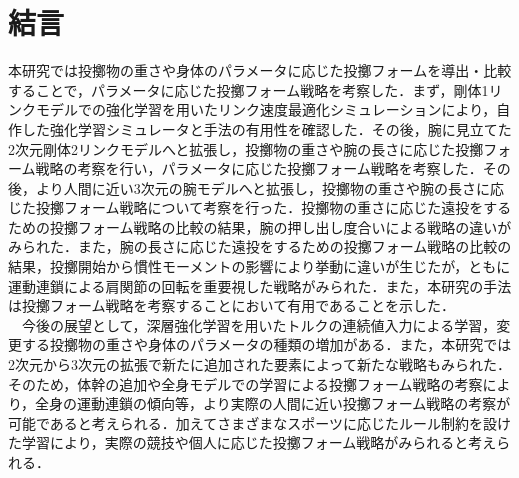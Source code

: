 \section{結言}
本研究では投擲物の重さや身体のパラメータに応じた投擲フォームを導出・比較することで，パラメータに応じた投擲フォーム戦略を考察した．まず，剛体1リンクモデルでの強化学習を用いたリンク速度最適化シミュレーションにより，自作した強化学習シミュレータと手法の有用性を確認した．その後，腕に見立てた2次元剛体2リンクモデルへと拡張し，投擲物の重さや腕の長さに応じた投擲フォーム戦略の考察を行い，パラメータに応じた投擲フォーム戦略を考察した．その後，より人間に近い3次元の腕モデルへと拡張し，投擲物の重さや腕の長さに応じた投擲フォーム戦略について考察を行った．投擲物の重さに応じた遠投をするための投擲フォーム戦略の比較の結果，腕の押し出し度合いによる戦略の違いがみられた．また，腕の長さに応じた遠投をするための投擲フォーム戦略の比較の結果，投擲開始から慣性モーメントの影響により挙動に違いが生じたが，ともに運動連鎖による肩関節の回転を重要視した戦略がみられた．また，本研究の手法は投擲フォーム戦略を考察することにおいて有用であることを示した．\\
　今後の展望として，深層強化学習を用いたトルクの連続値入力による学習，変更する投擲物の重さや身体のパラメータの種類の増加がある．また，本研究では2次元から3次元の拡張で新たに追加された要素によって新たな戦略もみられた．そのため，体幹の追加や全身モデルでの学習による投擲フォーム戦略の考察により，全身の運動連鎖の傾向等，より実際の人間に近い投擲フォーム戦略の考察が可能であると考えられる．加えてさまざまなスポーツに応じたルール制約を設けた学習により，実際の競技や個人に応じた投擲フォーム戦略がみられると考えられる．






